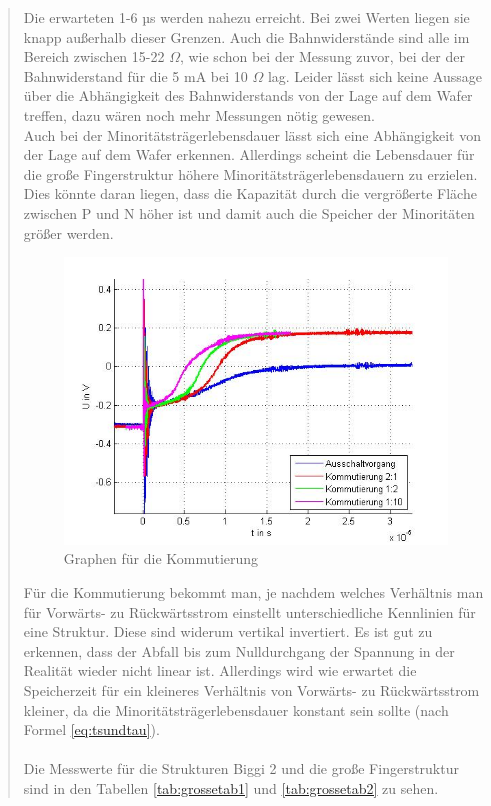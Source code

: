 \begin{quote}
     \vspace{2em}

	Die erwarteten 1-6 µs werden nahezu erreicht. Bei zwei Werten liegen sie
	knapp außerhalb dieser Grenzen. Auch die Bahnwiderstände sind alle im
	Bereich zwischen 15-22 $\Omega$, wie schon bei der Messung zuvor, bei der
	der Bahnwiderstand für die 5 mA bei 10 $\Omega$ lag. Leider lässt sich keine
	Aussage über die Abhängigkeit des Bahnwiderstands von der Lage auf dem
	Wafer treffen, dazu wären noch mehr Messungen nötig gewesen.\\
	Auch bei der Minoritätsträgerlebensdauer lässt sich eine Abhängigkeit von
	der Lage auf dem Wafer erkennen. Allerdings scheint die Lebensdauer für die
	große Fingerstruktur höhere Minoritätsträgerlebensdauern zu erzielen. Dies
	könnte daran liegen, dass die Kapazität durch die vergrößerte Fläche
	zwischen P und N höher ist und damit auch die Speicher der Minoritäten
	größer werden.

	\vspace{2em}

	\begin{figure}[H]
        \centering
        \includegraphics[scale=0.7]{./SchaltverhaltenBilder/Kommutierung_bild.jpg}
        \caption{Graphen für die Kommutierung}
        \label{fig:kommgraph}
    \end{figure}

	\vspace{2em}

	Für die Kommutierung bekommt man, je nachdem welches Verhältnis man für
    Vorwärts- zu Rückwärtsstrom einstellt unterschiedliche Kennlinien für eine
    Struktur. Diese sind widerum vertikal invertiert. Es ist gut zu erkennen,
    dass der Abfall bis zum Nulldurchgang der Spannung in der Realität wieder
    nicht linear ist. Allerdings wird wie erwartet die Speicherzeit für ein
    kleineres Verhältnis von Vorwärts- zu Rückwärtsstrom kleiner, da die
    Minoritätsträgerlebensdauer konstant sein sollte (nach Formel
    \ref{eq:tsundtau}).\\
    \\
	Die Messwerte für die Strukturen Biggi 2 und die große Fingerstruktur sind
	in den Tabellen \ref{tab:grossetab1} und \ref{tab:grossetab2} zu sehen.\\


\end{quote}
